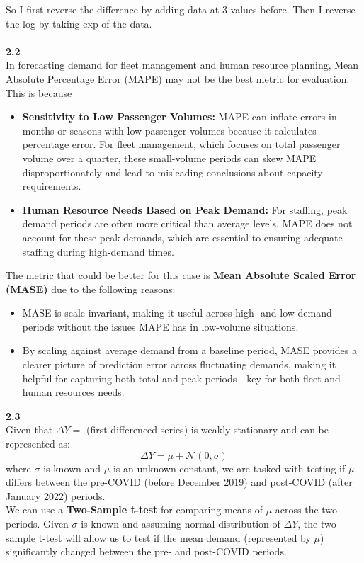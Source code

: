 So I first reverse the difference by adding data at 3 values before. Then I reverse the log by taking exp of the data. \\
\\
\textbf{2.2} \\
In forecasting demand for fleet management and human resource planning, Mean Absolute Percentage Error (MAPE) may not be the best metric for evaluation. This is because
\begin{itemize}
	\item \textbf{Sensitivity to Low Passenger Volumes:}  MAPE can inflate errors in months or seasons with low passenger volumes because it calculates percentage error. For fleet management, which focuses on total passenger volume over a quarter, these small-volume periods can skew MAPE disproportionately and lead to misleading conclusions about capacity requirements.
	\item \textbf{Human Resource Needs Based on Peak Demand:} For staffing, peak demand periods are often more critical than average levels. MAPE does not account for these peak demands, which are essential to ensuring adequate staffing during high-demand times.
\end{itemize}

The metric that could be better for this case is \textbf{Mean Absolute Scaled Error (MASE)} due to the following reasons:
\begin{itemize}
	\item MASE is scale-invariant, making it useful across high- and low-demand periods without the issues MAPE has in low-volume situations.
	\item By scaling against average demand from a baseline period, MASE provides a clearer picture of prediction error across fluctuating demands, making it helpful for capturing both total and peak periods—key for both fleet and human resources needs.
\end{itemize}
\textbf{2.3}\\
Given that $\Delta Y= $ (first-differenced series) is weakly stationary and can be represented as:
\begin{equation}
	\Delta Y = \mu + \mathcal{N}(0,\sigma)
\end{equation}
where $\sigma$ is known and $\mu$ is an unknown constant, we are tasked with testing if $\mu$ differs between the pre-COVID (before December 2019) and post-COVID (after January 2022) periods. 
\\
We can use a \textbf{Two-Sample t-test} for comparing means of $\mu$ across the two periods. Given $\sigma$ is known and assuming normal distribution of $\Delta Y$, the two-sample t-test will allow us to test if the mean demand (represented by $\mu$) significantly changed between the pre- and post-COVID periods.
